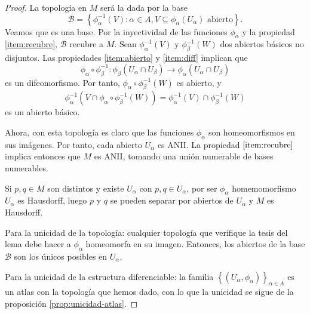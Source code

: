 \begin{proof}
  La topología en $M$ será la dada por la base
  \[
     \mathscr{B} = \left\{ \phi_{\alpha}^{-1}(V) : \alpha\in A, V\subseteq
      \phi_{\alpha}(U_{\alpha}) \text{ abierto} \right\}
    .\]
  Veamos que es una base. Por la inyectividad de las funciones $\phi_{\alpha}$ y
  la propiedad \ref{item:recubre}, $\mathscr{B}$ recubre a $M$. Sean
  $\phi_{\alpha}^{-1}(V)$ y $\phi_{\beta}^{-1}(W)$ dos abiertos básicos no
  disjuntos. Las propiedades \ref{item:abierto} y \ref{item:diff} implican que
  \[
    \phi_{\alpha}\circ\phi_{\beta}^{-1}: \phi_{\beta}(U_{\alpha}\cap
    U_{\beta})\to \phi_{\alpha}(U_{\alpha}\cap U_{\beta})
  \]
  es un difeomorfismo. Por tanto, $\phi_{\alpha}\circ\phi_{\beta}^{-1}(W)$ es
  abierto, y
  \[
    \phi_{\alpha}^{-1}(V\cap\phi_{\alpha}\circ\phi_{\beta}^{-1}(W)) = \phi_{\alpha}^{-1}(V)\cap\phi_{\beta}^{-1}(W)
  \]
  es un abierto básico.

  Ahora, con esta topología es claro que las funciones $\phi_{\alpha}$ son
  homeomorfismos en sus imágenes. Por tanto, cada abierto $U_{\alpha}$ es
  ANII. La propiedad $\ref{item:recubre}$ implica entonces que $M$ es ANII,
  tomando una unión numerable de bases numerables.

  Si $p,q\in M$ son distintos y existe $U_{\alpha}$ con $p,q\in U_{\alpha}$,
  por ser $\phi_{\alpha}$ homemomorfismo $U_{\alpha}$ es Hausdorff, luego $p$ y
  $q$ se pueden separar por abiertos de $U_{\alpha}$ y $M$ es Hausdorff.

  Para la unicidad de la topología: cualquier topología que verifique la tesis
  del lema debe hacer a $\phi_{\alpha}$ homeomorfa en su imagen. Entonces, los
  abiertos de la base $\mathscr{B}$ son los únicos posibles en $U_{\alpha}$.

  Para la unicidad de la estructura diferenciable: la familia $\left\{
    (U_{\alpha},\phi_{\alpha}) \right\}_{\alpha\in A}$ es un atlas con la
  topología que hemos dado, con lo que la unicidad se sigue de la proposición
  \ref{prop:unicidad-atlas}.
\end{proof}

